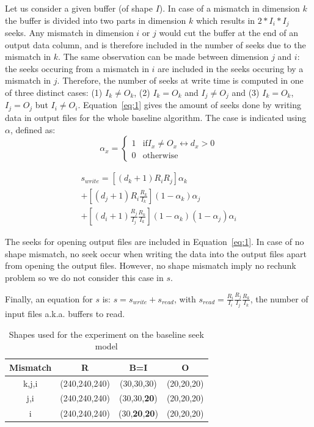 \documentclass[conference]{IEEEtran}
\begin{document}
Let us consider a given buffer (of shape $I$). In case of a mismatch in
dimension $k$ the buffer is divided into two parts in dimension $k$ which results
in  $2*I_i*I_j$ seeks. Any mismatch in dimension $i$ or $j$ would cut the
buffer at the end of an output data column, and is therefore included in
the number of seeks due to the mismatch in $k$. The same observation can be made
between dimension $j$ and $i$: the seeks occuring from a mismatch in $i$ are
included in the seeks occuring by a mismatch in $j$. Therefore, the number of
seeks at write time is computed in one of three distinct cases:
(1) $I_k \neq O_k$, (2) $I_k = O_k$ and $I_j \neq O_j$ and (3) $I_k = O_k$,
$I_j = O_j$ but $I_i \neq O_i$. Equation~\ref{eq:1} gives the amount of seeks
done by writing data in output files for the whole baseline algorithm.
The case is indicated using $\alpha$, defined as: \\
$$\alpha_x = \begin{cases}
   1 & \mathrm{if} I_x \neq O_x \leftrightarrow d_x > 0 \\
   0 & \mathrm{otherwise}
\end{cases}$$

\begin{multline} \label{eq:1}
s_{write} = [(d_k+1)R_iR_j]\alpha_k \\ + [(d_j+1)R_i\frac{R_k}{I_k}](1-\alpha_k)\alpha_j \\ + [(d_i+1)\frac{R_j}{I_j}\frac{R_k}{I_k}](1-\alpha_k)(1-\alpha_j)\alpha_i
\end{multline}

The seeks for opening output files are included in Equation~\ref{eq:1}.
In case of no shape mismatch, no seek occur when writing the data into the output
files apart from opening the output files. However, no shape mismatch imply no
rechunk problem so we do not consider this case in $s$.

Finally, an equation for $s$ is: $s = s_{write} + s_{read}$,
with $s_{read} = \frac{R_i}{I_i} \frac{R_j}{I_j} \frac{R_k}{I_k}$, the number of
input files a.k.a. buffers to read.


 \begin{table}[ht]
  \centering
  \caption{Shapes used for the experiment on the baseline seek model}

   \begin{tabular}[t]{c c c c}
   \hline
   Mismatch & R & B=I & O \\
     \hline\hline
     k,j,i & (240,240,240) & (30,30,30) & (20,20,20) \\
     \hline
     j,i & (240,240,240) & (30,30,\textbf{20}) & (20,20,20) \\
     \hline
     i & (240,240,240) & (30,\textbf{20},\textbf{20}) & (20,20,20) \\
     \hline
   \end{tabular}

   \label{tab:expseekmodel}

\end{table}
\end{document}
